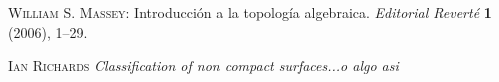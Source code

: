 \documentclass[a4paper,11pt,spanish, twoside, leqno]{tfg-uam}
\theoremstyle{definition}
\begin{document}
\begin{thebibliography}{10}

    \textsc{William S. Massey}: 
    Introducción a la topología algebraica. 
    \textit{Editorial Reverté} {\bf1} (2006), 1--29.

    \textsc{Ian Richards}
    \textit{Classification of non compact surfaces...o algo asi}
    
    
\end{thebibliography}
\cleardoublepage
\end{document}

